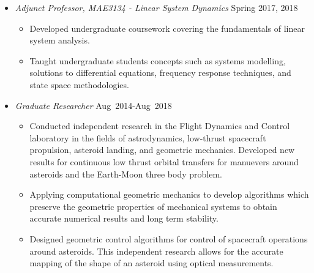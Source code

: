 \begin{itemize}
\begin{itemize}
            \end{itemize}
        \item[] \textit{Adjunct Professor, MAE3134 - Linear System Dynamics} \hfill {Spring 2017, 2018}
        \begin{itemize}
            \item Developed undergraduate coursework covering the fundamentals of linear system analysis.
            \item Taught undergraduate students concepts such as systems modelling, solutions to differential equations, frequency response techniques, and state space methodologies. 
        \end{itemize}
        \item[] \textit{Graduate Researcher} \hfill {Aug~2014-Aug~2018}
        \begin{itemize}
            \item Conducted independent research in the Flight Dynamics and Control laboratory in the fields of astrodynamics, low-thrust spacecraft propulsion, asteroid landing, and geometric mechanics.
            Developed new results for continuous low thrust orbital transfers for manuevers around asteroids and the Earth-Moon three body problem.
            \item Applying computational geometric mechanics to develop algorithms which preserve the geometric properties of mechanical systems to obtain accurate numerical results and long term stability.
            \item Designed geometric control algorithms for control of spacecraft operations around asteroids.
                This independent research allows for the accurate mapping of the shape of an asteroid using optical measurements.

\end{itemize}
\end{itemize}
